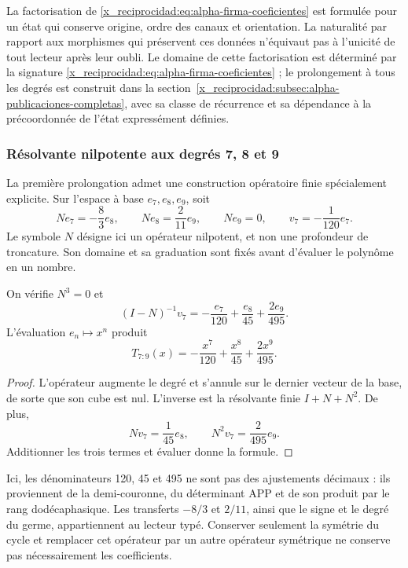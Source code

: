 La factorisation de \eqref{x_reciprocidad:eq:alpha-firma-coeficientes} est formulée
pour un état qui conserve origine, ordre des canaux et orientation. La
naturalité par rapport aux morphismes qui préservent ces données n’équivaut pas à
l’unicité de tout lecteur après leur oubli. Le domaine de cette
factorisation est déterminé par la signature
\eqref{x_reciprocidad:eq:alpha-firma-coeficientes} ; le prolongement à tous les degrés
est construit dans la section~\ref{x_reciprocidad:subsec:alpha-publicaciones-completas},
avec sa classe de récurrence et sa dépendance à la précoordonnée de l’état
expressément définies.

\subsubsection{Résolvante nilpotente aux degrés 7, 8 et 9}
\label{x_reciprocidad:subsec:alpha-resolvente}

La première prolongation admet une construction opératoire finie
spécialement explicite. Sur l'espace à base \(e_7,e_8,e_9\),
soit
\[
 Ne_7=-\frac83e_8,\qquad Ne_8=\frac2{11}e_9,\qquad Ne_9=0,
 \qquad v_7=-\frac1{120}e_7.
\]
Le symbole \(N\) désigne ici un opérateur nilpotent, et non une profondeur de troncature. Son domaine et sa graduation sont fixés avant d'évaluer le polynôme en un nombre.

\begin{lemma}
\label{x_reciprocidad:lem:alpha-resolvente}
On vérifie \(N^3=0\) et
\[
 (I-N)^{-1}v_7
 =-\frac{e_7}{120}+\frac{e_8}{45}+\frac{2e_9}{495}.
\]
L'évaluation \(e_n\mapsto x^n\) produit
\begin{equation}
 T_{7:9}(x)=-\frac{x^7}{120}+\frac{x^8}{45}+\frac{2x^9}{495}.
 \label{x_reciprocidad:eq:alpha-t79}
\end{equation}
\end{lemma}

\begin{proof}
L'opérateur augmente le degré et s'annule sur le dernier vecteur de la base,
de sorte que son cube est nul. L'inverse est la résolvante finie
\(I+N+N^2\). De plus,
\[
 Nv_7=\frac1{45}e_8,\qquad N^2v_7=\frac2{495}e_9.
\]
Additionner les trois termes et évaluer donne la formule.
\end{proof}

Ici, les dénominateurs 120, 45 et 495 ne sont pas des ajustements décimaux : ils proviennent de la demi-couronne, du déterminant APP et de son produit par le rang dodécaphasique. Les transferts \(-8/3\) et \(2/11\), ainsi que le signe et le degré du germe, appartiennent au lecteur typé. Conserver seulement la symétrie du cycle et remplacer cet opérateur par un autre opérateur symétrique ne conserve pas nécessairement les coefficients.

